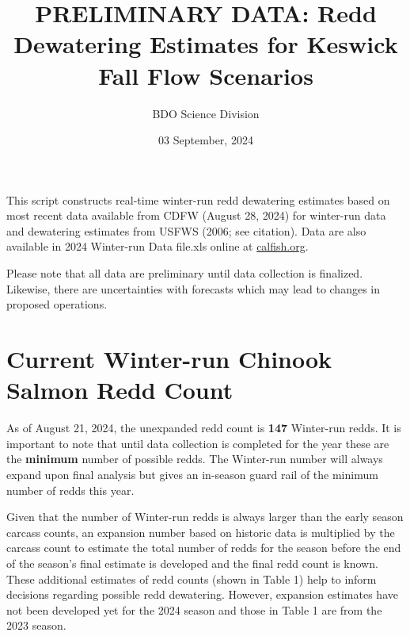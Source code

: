 \documentclass[
]{article}
\title{PRELIMINARY DATA: Redd Dewatering Estimates for Keswick Fall Flow
Scenarios}
\author{BDO Science Division}
\date{03 September, 2024}
\begin{document}
\maketitle

This script constructs real-time winter-run redd dewatering estimates
based on most recent data available from CDFW (August 28, 2024) for
winter-run data and dewatering estimates from USFWS (2006; see
citation). Data are also available in 2024 Winter-run Data file.xls
online at
\href{https://gcc02.safelinks.protection.outlook.com/?url=https\%3A\%2F\%2Fwww.calfish.org\%2FProgramsData\%2FConservationandManagement\%2FCentralValleyMonitoring\%2FCDFWUpperSacRiverBasinSalmonidMonitoring.aspx\&data=05\%7C01\%7Clelliott\%40usbr.gov\%7C689ebb9a6c8243b4f96c08da90f5c542\%7C0693b5ba4b184d7b9341f32f400a5494\%7C0\%7C0\%7C637981682646098788\%7CUnknown\%7CTWFpbGZsb3d8eyJWIjoiMC4wLjAwMDAiLCJQIjoiV2luMzIiLCJBTiI6Ik1haWwiLCJXVCI6Mn0\%3D\%7C3000\%7C\%7C\%7C\&sdata=A1eQkWPxbkXxnzEvc2K8\%2FTmslZ8H8zvxdks3\%2F78Yrvw\%3D\&reserved=0}{calfish.org}.

Please note that all data are preliminary until data collection is
finalized. Likewise, there are uncertainties with forecasts which may
lead to changes in proposed operations.

\hypertarget{current-winter-run-chinook-salmon-redd-count}{%
\section{Current Winter-run Chinook Salmon Redd
Count}\label{current-winter-run-chinook-salmon-redd-count}}

As of August 21, 2024, the unexpanded redd count is \textbf{147}
Winter-run redds. It is important to note that until data collection is
completed for the year these are the \textbf{minimum} number of possible
redds. The Winter-run number will always expand upon final analysis but
gives an in-season guard rail of the minimum number of redds this year.

Given that the number of Winter-run redds is always larger than the
early season carcass counts, an expansion number based on historic data
is multiplied by the carcass count to estimate the total number of redds
for the season before the end of the season's final estimate is
developed and the final redd count is known. These additional estimates
of redd counts (shown in Table 1) help to inform decisions regarding
possible redd dewatering. However, expansion estimates have not been
developed yet for the 2024 season and those in Table 1 are from the 2023
season.
\end{document}
